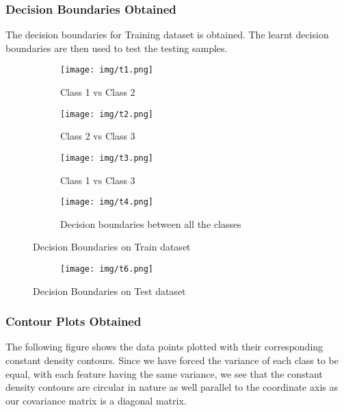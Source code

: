 \subsubsection{Decision Boundaries Obtained}
The decision boundaries for Training dataset is obtained. The learnt decision boundaries are then used to test the testing samples.\\
\begin{figure}[!hbt]
    \begin{subfigure}{0.49\textwidth}
        \texttt{[image: img/t1.png]}
        \caption{Class 1 vs Class 2 }
    \end{subfigure}%
    \hfill
    \begin{subfigure}{0.49\textwidth}
        \texttt{[image: img/t2.png]}
        \caption{Class 2 vs Class 3}
    \end{subfigure}
    
    \begin{subfigure}{0.49\textwidth}
        \texttt{[image: img/t3.png]}
        \caption{Class 1 vs Class 3}
    \end{subfigure}%
    \hfill
    \begin{subfigure}{0.49\textwidth}
        \texttt{[image: img/t4.png]}
        \caption{Decision boundaries between all the classes}
    \end{subfigure}
    
    \caption{Decision Boundaries on Train dataset}
\end{figure}

\begin{figure}[!hbt]
\centering
\begin{subfigure}{0.49\textwidth}
        \texttt{[image: img/t6.png]}
    \end{subfigure}
\caption{Decision Boundaries on Test dataset}
\end{figure}

\subsubsection{Contour Plots Obtained}
The following figure shows the data points plotted with their corresponding constant density contours. Since we have forced the variance of each class to be equal, with each feature having the same variance, we see that the constant density contours are circular in nature as well parallel to the coordinate axis as our covariance matrix is a diagonal matrix.\\

